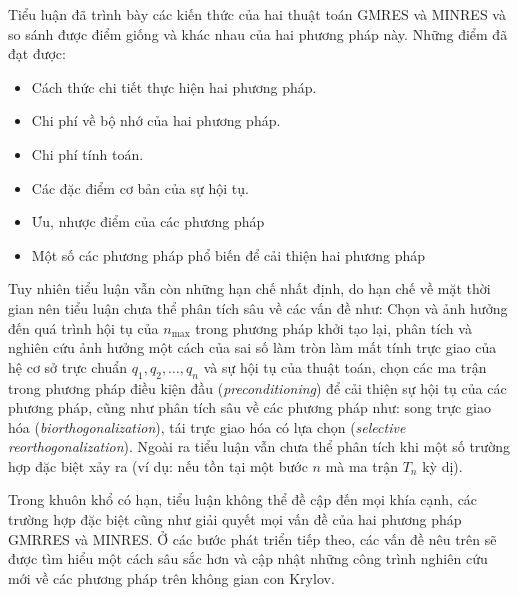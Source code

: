 \documentclass[14pt, a4paper]{article}
\numberwithin{equation}{section}
\numberwithin{algorithm}{section}
\numberwithin{figure}{section}
\numberwithin{dl}{section}
\numberwithin{md}{section}
\numberwithin{bd}{section}
\numberwithin{dn}{section}
\begin{document}
Tiểu luận đã trình bày các kiến thức của hai thuật toán GMRES và MINRES và so sánh được điểm giống và khác nhau của hai phương pháp này.
Những điểm đã đạt được:

\begin{itemize}
    \item Cách thức chi tiết thực hiện hai phương pháp.
    \item Chi phí về bộ nhớ của hai phương pháp.
    \item Chi phí tính toán.
    \item Các đặc điểm cơ bản của sự hội tụ.
    \item Ưu, nhược điểm của các phương pháp
    \item Một số các phương pháp phổ biến để cải thiện hai phương pháp
\end{itemize}

Tuy nhiên tiểu luận vẫn còn những hạn chế nhất định, do hạn chế về mặt thời gian nên tiểu luận chưa thể phân tích sâu về các vấn đề như: Chọn và ảnh hưởng đến quá trình hội tụ của $n_{\max}$ trong phương pháp khởi tạo lại, phân tích và nghiên cứu ảnh hưởng một cách của sai số làm tròn làm mất tính trực giao của hệ cơ sở trực chuẩn $q_1, q_2, \dots, q_n$ và sự hội tụ của thuật toán, chọn các ma trận trong phương pháp điều kiện đầu (\textit{preconditioning}) để cải thiện sự hội tụ của các phương pháp,
cũng như phân tích sâu về các phương pháp như: song trực giao hóa (\textit{biorthogonalization}), tái trực giao hóa có lựa chọn (\textit{selective reorthogonalization}).
Ngoài ra tiểu luận vẫn chưa thể phân tích khi một số trường hợp đặc biệt xảy ra (ví dụ: nếu tồn tại một bước $n$ mà ma trận $T_n$ kỳ dị).

Trong khuôn khổ có hạn, tiểu luận không thể đề cập đến mọi khía cạnh, các trường hợp đặc biệt cũng như giải quyết mọi vấn đề của hai phương pháp GMRRES và MINRES. Ở các bước phát triển tiếp theo, các vấn đề nêu trên sẽ được tìm hiểu một cách sâu sắc hơn và cập nhật những công trình nghiên cứu mới về các phương pháp trên không gian con Krylov.
\newpage
{}
%
%
\printbibliography[title={TÀI LIỆU THAM KHẢO}]

\end{document}
